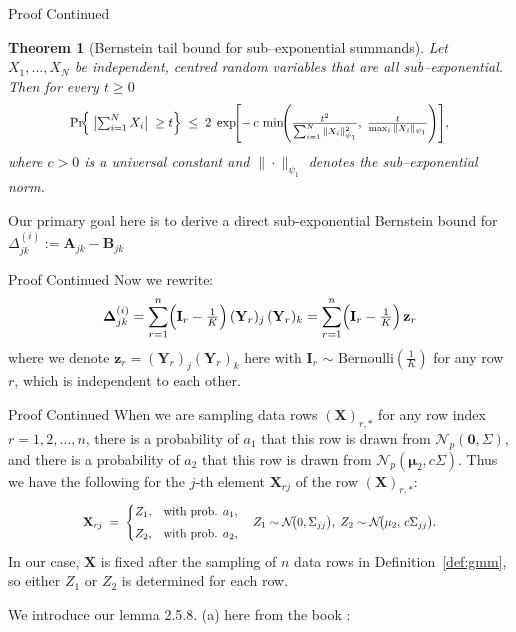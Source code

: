 \documentclass{beamer}
\newtheorem{thm}{Theorem}
\theoremstyle{remark}
\begin{document}
\begin{frame}{Proof Continued}
\begin{thm}[Bernstein tail bound for sub–exponential summands]
  \label{thm:bernstein}
  Let \(X_{1},\dots ,X_{N}\) be independent, centred random variables that
  are all sub–exponential.  Then for every \(t\ge 0\)
  \[
  \scalebox{0.90}{$
  \Pr\!\Bigl\{\;\bigl|\textstyle\sum_{i=1}^{N} X_{i}\bigr|\;\ge t\Bigr\}
     \;\le\;
     2\;\exp\!\Biggl[
       -\,c\,
       \min\!\Biggl(
         \frac{t^{2}}{\sum_{i=1}^{N}\|X_{i}\|_{\psi_{1}}^{2}},
         \;
         \frac{t}{\max_{i}\|X_{i}\|_{\psi_{1}}}
       \Biggr)
     \Biggr],
  $}
  \]
  where \(c>0\) is a universal constant and
  \(\|\cdot\|_{\psi_{1}}\) denotes the sub–exponential norm.
  \end{thm}
Our primary goal here is to derive a 
direct sub-exponential Bernstein bound for \(\Delta_{jk}^{(i)} := \mathbf{A}_{jk} - \mathbf{B}_{jk}\)
\end{frame}
\begin{frame}{Proof Continued}
Now we rewrite:
\[
  \mathbf{\Delta}_{jk}^{(i)} = \sum_{r=1}^{n}\Bigl(\mathbf{I}_{r}-\tfrac1K\Bigr)\,(\mathbf{Y}_{r})_{j}\,(\mathbf{Y}_{r})_{k} = \sum_{r=1}^{n}\Bigl(\mathbf{I}_{r}-\tfrac1K\Bigr)\, \mathbf{z}_r
\]
where we denote $\mathbf{z}_r=(\mathbf{Y}_{r})_{j}(\mathbf{Y}_{r})_{k}$ here
with $\mathbf{I}_r$ $\sim$ $\text{Bernoulli}(\frac{1}{K})$ for any row $r$, which is independent to each other.
\end{frame}
\begin{frame}{Proof Continued}
When we are sampling data rows $(\mathbf{X})_{r,*}$ for any row index $r=1,2,\ldots,n$,
there is a probability of $a_1$ that this row is drawn from $\mathcal N_{p}(\boldsymbol0,\Sigma)$, 
and there is a probability of $a_2$ that this row is drawn from $\mathcal N_{p}(\boldsymbol\mu_{2},c\Sigma)$.
Thus we have the following for the $j$-th element $\mathbf{X}_{rj}$ of the row $(\mathbf{X})_{r,*}$:
\[
\scalebox{0.85}{$
    \mathbf{X}_{rj} \;=\;
    \begin{cases}
        Z_1, & \text{with prob. } a_1,\\[4pt]
        Z_2, & \text{with prob. } a_2,
    \end{cases}
    \quad
    Z_1 \sim \mathcal N\!\bigl(0,\Sigma_{jj}\bigr),\;
    Z_2 \sim \mathcal N\!\bigl(\mu_2,\,c\Sigma_{jj}\bigr).
$}
\]
In our case, $\mathbf{X}$ is fixed after the sampling of $n$ data rows in Definition~\ref{def:gmm},
so either $Z_{1}$ or $Z_{2}$ is determined for each row.

We introduce our lemma 2.5.8. (a) here from the book \cite{vershynin2018high}:
\end{frame}
\end{document}
